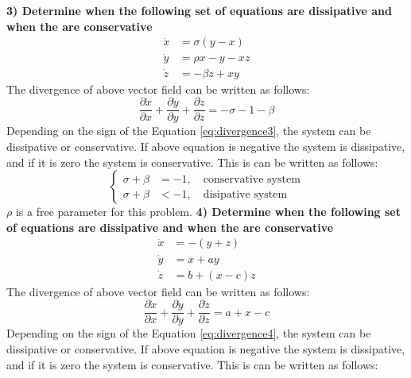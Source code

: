 \documentclass[12pt, a4paper]{extreport}
\begin{document}
\newpage
{\flushleft\large{\textbf{3) Determine when the following set of equations are dissipative and when the are conservative}}}
%
\begin{equation}
\begin{aligned}
	\dot{x} &= \sigma (y - x) \\
	\dot{y} &= \rho x - y - xz \\
	\dot{z} &= -\beta z + xy
\end{aligned}
\end{equation}
%
The divergence of above vector field can be written as follows:
%
\begin{equation}\label{eq:divergence3}
	\frac{\partial \dot{x}}{\partial x} +
	\frac{\partial \dot{y}}{\partial y} +
	\frac{\partial \dot{z}}{\partial z} = 
	-\sigma - 1 - \beta
\end{equation}
%
Depending on the sign of the Equation \eqref{eq:divergence3}, the system can be dissipative or conservative. If above equation is negative the system is dissipative, and if it is zero the system is conservative. This is can be written as follows:
%
\begin{equation}
\begin{cases}
	\sigma + \beta &= -1, \quad \text{conservative system} \\
	\sigma + \beta &< -1, \quad \text{disipative system}
\end{cases}
\end{equation}
%
$\rho$ is a free parameter for this problem.
\newpage
{\flushleft\large{\textbf{4) Determine when the following set of equations are dissipative and when the are conservative}}}
%
\begin{equation}
\begin{aligned}
	\dot{x} &= -(y + z) \\
	\dot{y} &= x + ay \\
	\dot{z} &= b + (x - c)z
\end{aligned}
\end{equation}
%
The divergence of above vector field can be written as follows:
%
\begin{equation}\label{eq:divergence4}
	\frac{\partial \dot{x}}{\partial x} +
	\frac{\partial \dot{y}}{\partial y} +
	\frac{\partial \dot{z}}{\partial z} = 
	a + x - c
\end{equation}
%
Depending on the sign of the Equation \eqref{eq:divergence4}, the system can be dissipative or conservative. If above equation is negative the system is dissipative, and if it is zero the system is conservative. This is can be written as follows:
\end{document}
